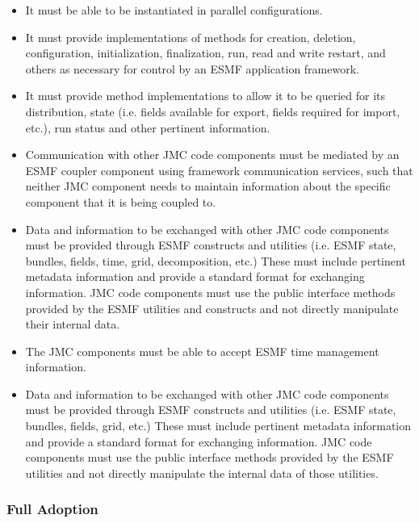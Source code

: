 \begin{itemize}
\item It must be able to be instantiated in parallel configurations.

\item It must provide implementations of methods for creation, deletion, 
configuration, initialization, finalization, run, read and write 
restart, and others as necessary for control by an ESMF application 
framework.

\item It must provide method implementations to allow it to be queried 
for its distribution, state (i.e. fields available for export, fields 
required for import, etc.), run status and other pertinent 
information.

\item Communication with other JMC code components must be mediated by an 
ESMF coupler component using framework communication services, such 
that neither JMC component needs to maintain information about the 
specific component that it is being coupled to. 

\item Data and information to be exchanged with other JMC code components
must be provided through ESMF constructs and utilities (i.e. ESMF state,
bundles, fields, time, grid, decomposition, etc.) These must include
pertinent metadata information and provide a standard format for
exchanging information. JMC code components must use the public
interface methods provided by the ESMF utilities and constructs and not
directly manipulate their internal data.

\item The JMC components must be able to accept ESMF time management 
information.

\item Data and information to be exchanged with other JMC code components
must be provided through ESMF constructs and utilities (i.e. ESMF state,
bundles, fields, grid, etc.) These must include
pertinent metadata information and provide a standard format for
exchanging information.  JMC code components must use the public 
interface methods provided by the ESMF utilities and not directly 
manipulate the internal data of those utilities.  

\end{itemize}

\subsubsection{Full Adoption}

